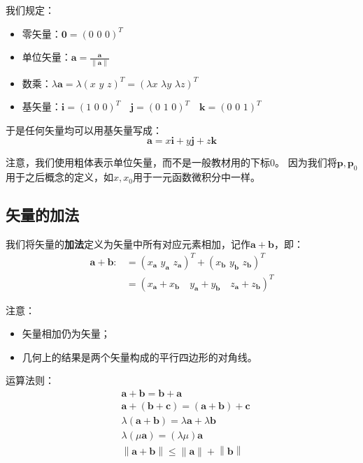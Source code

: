 我们规定：
\begin{itemize}
    \item 零矢量：$\mathbf{0}=\left( 0\,\,0\,\,0 \right) ^T$
    \item 单位矢量：$\mathbf{a}=\frac{\boldsymbol{a}}{\left\| \boldsymbol{a} \right\|}$
    \item 数乘：$\lambda \boldsymbol{a}=\lambda \left( x\,\,y\,\,z \right) ^T=\left( \lambda x\,\,\lambda y\,\,\lambda z \right) ^T$
    \item 基矢量：$\mathbf{i}=\left( 1\,\,0\,\,0 \right) ^T \quad \mathbf{j}=\left( 0\,\,1\,\,0 \right) ^T \quad \mathbf{k}=\left( 0\,\,0\,\,1 \right) ^T$
\end{itemize}
于是任何矢量均可以用基矢量写成：
\[
\boldsymbol{a}=x\mathbf{i}+y\mathbf{j}+z\mathbf{k}
\]

\begin{tcolorbox}
注意，我们使用粗体表示单位矢量，而不是一般教材用的下标0。
因为我们将$\boldsymbol{p},\boldsymbol{p}_0$用于之后概念的定义，如$x,x_0$用于一元函数微积分中一样。
\end{tcolorbox}

\subsection{矢量的加法}

\begin{definition}[加法]
我们将矢量的{\bf 加法}定义为矢量中所有对应元素相加，记作$\boldsymbol{a}+\boldsymbol{b}$，即：
\begin{align*}
\boldsymbol{a}+\boldsymbol{b}:&=\left( x_{\boldsymbol{a}}\,\,y_{\boldsymbol{a}}\,\,z_{\boldsymbol{a}} \right) ^T+\left( x_{\boldsymbol{b}}\,\,y_{\boldsymbol{b}}\,\,z_{\boldsymbol{b}} \right) ^T \\
&=\left( x_{\boldsymbol{a}}+x_{\boldsymbol{b}} \quad y_{\boldsymbol{a}}+y_{\boldsymbol{b}} \quad z_{\boldsymbol{a}}+z_{\boldsymbol{b}} \right) ^T
\end{align*}
\end{definition}

注意：
\begin{itemize}
    \item 矢量相加仍为矢量；
    \item 几何上的结果是两个矢量构成的平行四边形的对角线。
\end{itemize}

运算法则：
\begin{align*}
&\boldsymbol{a}+\boldsymbol{b}=\boldsymbol{b}+\boldsymbol{a} \\
&\boldsymbol{a}+\left( \boldsymbol{b}+\boldsymbol{c} \right) =\left( \boldsymbol{a}+\boldsymbol{b} \right) +\boldsymbol{c} \\
&\lambda \left( \boldsymbol{a}+\boldsymbol{b} \right) =\lambda \boldsymbol{a}+\lambda \boldsymbol{b} \\
&\lambda \left( \mu \boldsymbol{a} \right) =\left( \lambda \mu \right) \boldsymbol{a} \\
&\left\| \boldsymbol{a}+\boldsymbol{b} \right\| \leqslant \left\| \boldsymbol{a} \right\| +\left\| \boldsymbol{b} \right\|
\end{align*}

